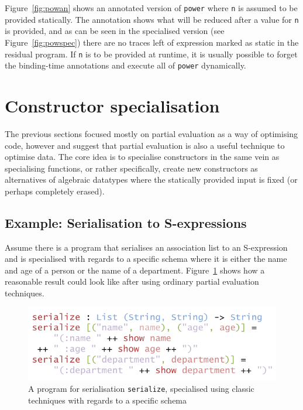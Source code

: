 \documentclass{ituthesis}
\newcommand{\ttdec}[1]{\textcolor{declared-var-color}{\texttt{#1}}}
\newcommand{\ttvar}[1]{\textcolor{local-var-color}{\texttt{#1}}}
\theoremstyle{break}
\begin{document}
Figure~\ref{fig:powan} shows an annotated version of \ttdec{power} where \ttvar{n} is assumed to be provided statically.
The annotation shows what will be reduced after a value for \ttvar{n} is provided, and as can be seen in the specialised version (see Figure~\ref{fig:powspec}) there
are no traces left of expression marked as static in the residual program.
If \ttvar{n} is to be provided at runtime, it is usually possible to forget the binding-time annotations and execute all of \ttdec{power} dynamically.


\section{Constructor specialisation}
\label{sec:ConstructorSpecialisation}
The previous sections focused mostly on partial evaluation as a way of optimising code, however \textcite{Mogensen:1993:CS:154630.154633} and \textcite{Dussart:1995:PCS:215465.215554} suggest that partial evaluation is also a useful technique to optimise data.
The core idea is to specialise constructors in the same vein as specialising functions, or rather specifically, create new constructors as alternatives of algebraic datatypes where the statically provided input is fixed (or perhaps completely erased).

\subsection{Example: Serialisation to S-expressions}
\label{sub:Example:SerialisationtoS-expressions}

Assume there is a program that serialises an association list to an S-expression and is specialised with regards to a specific schema where it is either the name and age of a person or the name of a department.
Figure~\ref{fig:conspec} shows how a reasonable result could look like after using ordinary partial evaluation techniques.

\begin{figure}[ht]
\begin{center}
    \includegraphics[scale=0.5]{Figures/ConstructorSpecialisation.png}
\end{center}
\caption{A program for serialisation \ttdec{serialize}, specialised using classic techniques with regards to a specific schema}
\label{fig:conspec}
\end{figure}
\end{document}
